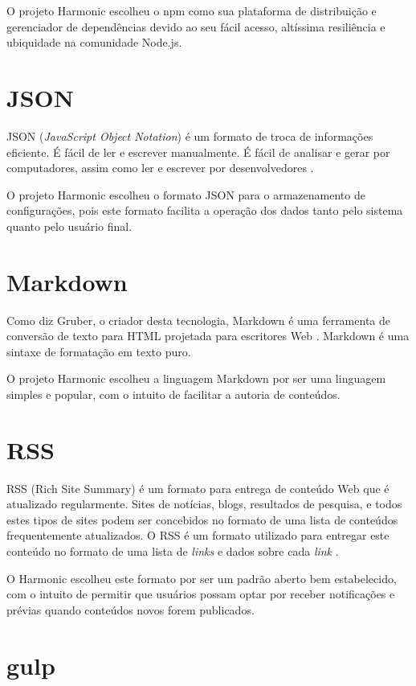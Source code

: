 \documentclass[ppginf, pep]{esinucpel}
\begin{document}
O projeto Harmonic escolheu o npm como sua plataforma de distribuição e gerenciador de dependências devido ao seu fácil acesso, altíssima resiliência e ubiquidade na comunidade Node.js.

\section{JSON}

JSON (\textit{JavaScript Object Notation}) é um formato de troca de informações eficiente. É fácil de ler e escrever manualmente. É fácil de analisar e gerar por computadores, assim como ler e escrever por desenvolvedores \cite{json}.

O projeto Harmonic escolheu o formato JSON para o armazenamento de configurações, pois este formato facilita a operação dos dados tanto pelo sistema quanto pelo usuário final.

\section{Markdown}

Como diz Gruber, o criador desta tecnologia, Markdown é uma ferramenta de conversão de texto para HTML projetada para escritores Web \cite{markdown}. Markdown é uma sintaxe de formatação em texto puro.

O projeto Harmonic escolheu a linguagem Markdown por ser uma linguagem simples e popular, com o intuito de facilitar a autoria de conteúdos.

\section{RSS}

RSS (Rich Site Summary) é um formato para entrega de conteúdo Web que é atualizado regularmente. Sites de notícias, blogs, resultados de pesquisa, e todos estes tipos de sites podem ser concebidos no formato de uma lista de conteúdos frequentemente atualizados. O RSS é um formato utilizado para entregar este conteúdo no formato de uma lista de \textit{links} e dados sobre cada \textit{link} \cite{rss}.

O Harmonic escolheu este formato por ser um padrão aberto bem estabelecido, com o intuito de permitir que usuários possam optar por receber notificações e prévias quando conteúdos novos forem publicados.

\section{gulp}
\end{document}
